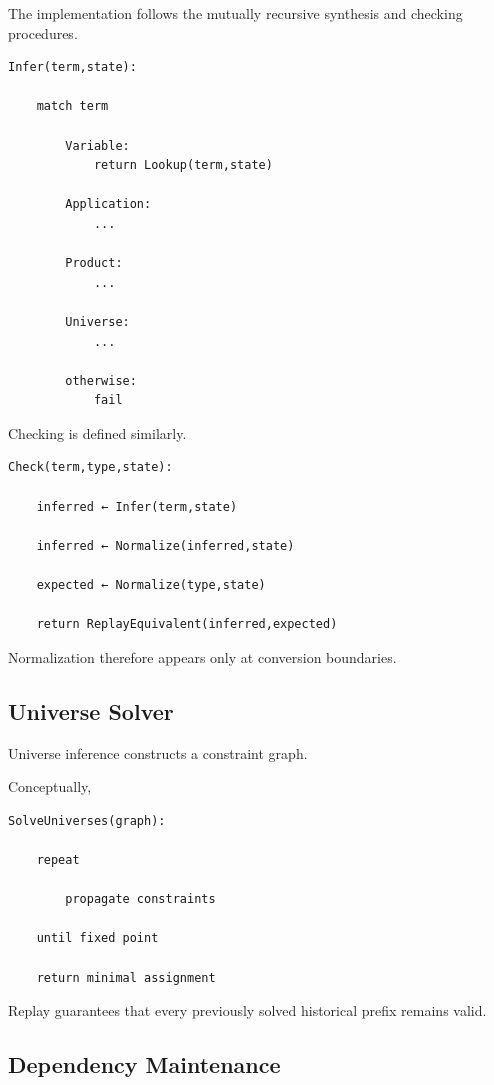 \documentclass[12pt,oneside]{article}
\theoremstyle{definition}
\theoremstyle{remark}
\begin{document}
The implementation follows the mutually recursive synthesis and checking
procedures.

\begin{verbatim}
Infer(term,state):

    match term

        Variable:
            return Lookup(term,state)

        Application:
            ...

        Product:
            ...

        Universe:
            ...

        otherwise:
            fail
\end{verbatim}

Checking is defined similarly.

\begin{verbatim}
Check(term,type,state):

    inferred ← Infer(term,state)

    inferred ← Normalize(inferred,state)

    expected ← Normalize(type,state)

    return ReplayEquivalent(inferred,expected)
\end{verbatim}

Normalization therefore appears only at conversion boundaries.


\subsection{Universe Solver}

Universe inference constructs a constraint graph.

Conceptually,

\begin{verbatim}
SolveUniverses(graph):

    repeat

        propagate constraints

    until fixed point

    return minimal assignment
\end{verbatim}

Replay guarantees that every previously solved historical prefix remains valid.


\subsection{Dependency Maintenance}
\end{document}
